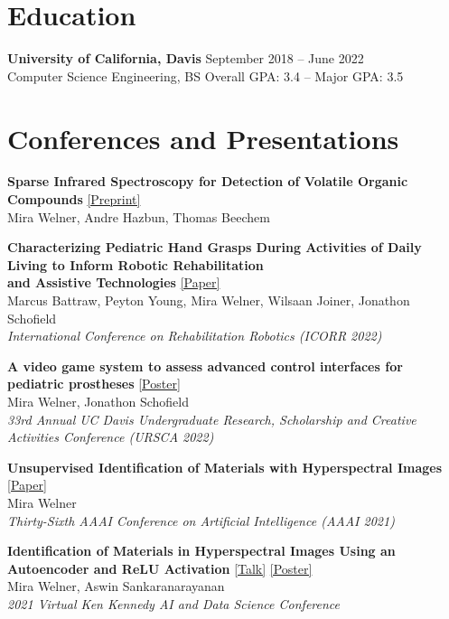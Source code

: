 \documentclass[a4paper]{comcv}
\begin{document}
\section{Education}
\begin{flushleft}
\textbf{University of California, Davis} \hfill September 2018 -- June 2022\\
Computer Science Engineering, BS \hfill Overall GPA: 3.4 -- Major GPA: 3.5
\end{flushleft}

\section{Conferences and Presentations}
\noindent\small\textbf{Sparse Infrared Spectroscopy for Detection of Volatile Organic Compounds }\href{https://arxiv.org/abs/2506.20678}{   [Preprint]}\\
\indent Mira Welner, Andre Hazbun, Thomas Beechem

\noindent\small\textbf{Characterizing Pediatric Hand Grasps During Activities of Daily Living to Inform
Robotic Rehabilitation \\and Assistive Technologies }\href{https://pubmed.ncbi.nlm.nih.gov/36176073/}{  [Paper]}\\
\indent Marcus Battraw, Peyton Young, Mira Welner, Wilsaan Joiner, Jonathon Schofield\\
\indent \textit{International Conference on Rehabilitation Robotics (ICORR 2022)}

\noindent\textbf{A video game system to assess advanced control interfaces for pediatric prostheses  }\href{https://miraewelner.com/docs/schofield_presentation.pdf}{  [Poster]}\\
\indent Mira Welner, Jonathon Schofield\\
\indent \textit{33rd Annual UC Davis Undergraduate Research, Scholarship and Creative Activities Conference (URSCA 2022)}

\noindent\textbf{Unsupervised Identification of Materials with Hyperspectral Images } \href{https://ojs.aaai.org/index.php/AAAI/article/view/21708}{  [Paper]}\\
\indent Mira Welner\\
\indent \textit{Thirty-Sixth AAAI Conference on Artificial Intelligence (AAAI 2021)}

\noindent\textbf{Identification of Materials in Hyperspectral Images Using an Autoencoder and ReLU Activation } \href{https://youtu.be/CvCrZSAqwbI}{[Talk]}   \href{https://mirawelner.com/docs/rice_poster}{[Poster]}\\
\indent Mira Welner, Aswin Sankaranarayanan\\
\indent \textit{2021 Virtual Ken Kennedy AI and Data Science Conference}
\end{document}
